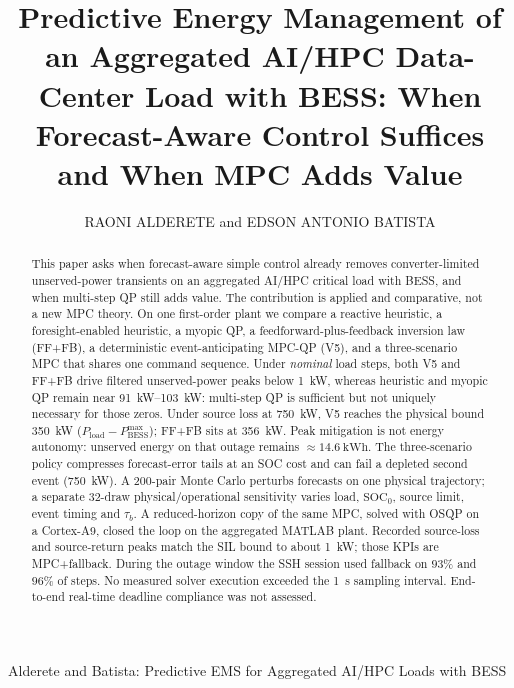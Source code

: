 \documentclass{ieeeaccess}
\begin{document}

\title{Predictive Energy Management of an Aggregated AI/HPC Data-Center Load with BESS: When Forecast-Aware Control Suffices and When MPC Adds Value}

\author{\uppercase{Raoni Alderete} and
\uppercase{Edson Antonio Batista}}
\address[1]{Graduate Program in Electrical Engineering, Universidade Federal de Mato Grosso do Sul (UFMS), Campo Grande, MS 79070-900, Brazil (e-mail: raoni.alderete@ufms.br)}
\address[2]{Faculty of Engineering, Architecture, Urbanism and Geography (FAENG), and Embedded Systems Laboratory (LABSEM), Universidade Federal de Mato Grosso do Sul (UFMS), Campo Grande, MS 79070-900, Brazil (e-mail: edson.batista@ufms.br)}

%
{Alderete and Batista: Predictive EMS for Aggregated AI/HPC Loads with BESS}


\begin{abstract}
This paper asks when forecast-aware simple control already removes converter-limited unserved-power transients on an aggregated AI/HPC critical load with BESS, and when multi-step QP still adds value. The contribution is applied and comparative, not a new MPC theory. On one first-order plant we compare a reactive heuristic, a foresight-enabled heuristic, a myopic QP, a feedforward-plus-feedback inversion law (FF+FB), a deterministic event-anticipating MPC-QP (V5), and a three-scenario MPC that shares one command sequence. Under \emph{nominal} load steps, both V5 and FF+FB drive filtered unserved-power peaks below \SI{1}{\kilo\watt}, whereas heuristic and myopic QP remain near \SIrange{91}{103}{\kilo\watt}: multi-step QP is sufficient but not uniquely necessary for those zeros. Under source loss at \SI{750}{\kilo\watt}, V5 reaches the physical bound \SI{350}{\kilo\watt} ($P_{\mathrm{load}}-P_{\mathrm{BESS}}^{\max}$); FF+FB sits at \SI{356}{\kilo\watt}. Peak mitigation is not energy autonomy: unserved energy on that outage remains $\approx\SI{14.6}{\kilo\watt\hour}$. The three-scenario policy compresses forecast-error tails at an SOC cost and can fail a depleted second event (\SI{750}{\kilo\watt}). A 200-pair Monte Carlo perturbs forecasts on one physical trajectory; a separate 32-draw physical/operational sensitivity varies load, $\mathrm{SOC}_0$, source limit, event timing and $\tau_b$. A reduced-horizon copy of the same MPC, solved with OSQP on a Cortex-A9, closed the loop on the aggregated MATLAB plant. Recorded source-loss and source-return peaks match the SIL bound to about \SI{1}{\kilo\watt}; those KPIs are MPC+fallback. During the outage window the SSH session used fallback on $93\%$ and $96\%$ of steps. No measured solver execution exceeded the \SI{1}{\second} sampling interval. End-to-end real-time deadline compliance was not assessed.
\end{abstract}
\end{document}

